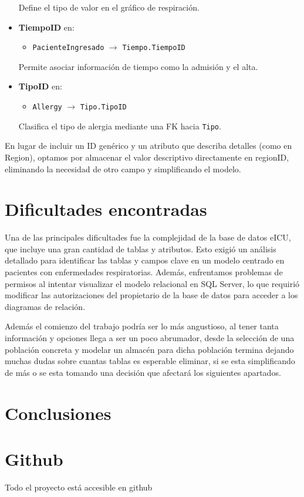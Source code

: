 \documentclass[12pt, a4paper, twoside]{article}
\begin{document}
\begin{itemize}
		Define el tipo de valor en el gráfico de respiración.
		
		\item \textbf{TiempoID} en:
		\begin{itemize}
			\item \texttt{PacienteIngresado} $\rightarrow$ \texttt{Tiempo.TiempoID}
		\end{itemize}
		
		Permite asociar información de tiempo como la admisión y el alta.
		
		\item \textbf{TipoID} en:
		\begin{itemize}
			\item \texttt{Allergy} $\rightarrow$ \texttt{Tipo.TipoID}
		\end{itemize}
		
		Clasifica el tipo de alergia mediante una FK hacia \texttt{Tipo}.
		
	\end{itemize}
	
	
	En lugar de incluir un ID genérico y un atributo que describa detalles (como en Region), optamos por almacenar el valor descriptivo directamente en regionID, eliminando la necesidad de otro campo y simplificando el modelo.
	
	\section{Dificultades encontradas}
	
	
	Una de las principales dificultades fue la complejidad de la base de datos eICU, que incluye una gran cantidad de tablas y atributos. Esto exigió un análisis detallado para identificar las tablas y campos clave en un modelo centrado en pacientes con enfermedades respiratorias. Además, enfrentamos problemas de permisos al intentar visualizar el modelo relacional en SQL Server, lo que requirió modificar las autorizaciones del propietario de la base de datos para acceder a los diagramas de relación.
	
	Además el comienzo del trabajo podría ser lo más angustioso, al tener tanta información y opciones llega a ser un poco abrumador, desde la selección de una población concreta y modelar un almacén para dicha población termina dejando muchas dudas sobre cuantas tablas es esperable eliminar, si se esta simplificando de más o se esta tomando una decisión que afectará los siguientes apartados. 
	
	\section{Conclusiones}
	
	\section{Github}

	Todo el proyecto está accesible en github \cite{depab2024}
	\printbibliography
	
	
	
	
\end{document}
